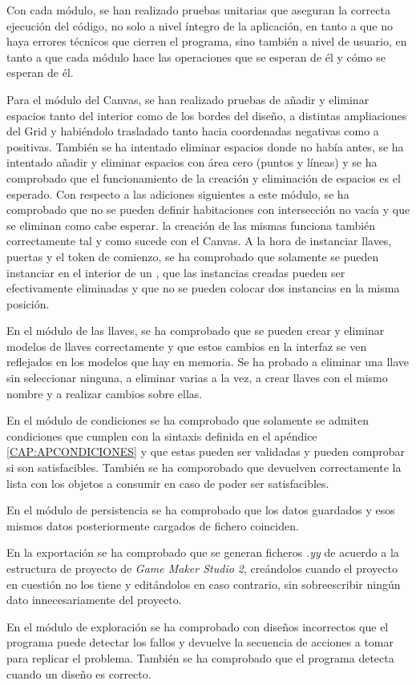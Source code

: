Con cada módulo, se han realizado pruebas unitarias que aseguran la correcta ejecución del código, no solo a nivel íntegro de la aplicación, en tanto a que no haya errores técnicos que cierren el programa, sino también a nivel de usuario, en tanto a que cada módulo hace las operaciones que se esperan de él y cómo se esperan de él.

Para el módulo del Canvas, se han realizado pruebas de añadir y eliminar espacios tanto del interior como de los bordes del diseño, a distintas ampliaciones del Grid y habiéndolo trasladado tanto hacia coordenadas negativas como a positivas. También se ha intentado eliminar espacios donde no había antes, se ha intentado añadir y eliminar espacios con área cero (puntos y líneas) y se ha comprobado que el funcionamiento de la creación y eliminación de espacios es el esperado.
Con respecto a las adiciones siguientes a este módulo, se ha comprobado que no se pueden definir habitaciones con intersección no vacía y que se eliminan como cabe esperar. la creación de las mismas funciona también correctamente tal y como sucede con el Canvas.
A la hora de instanciar llaves, puertas y el token de comienzo, se ha comprobado que solamente se pueden instanciar en el interior de un , que las instancias creadas pueden ser efectivamente eliminadas y que no se pueden colocar dos instancias en la misma posición.

En el módulo de las llaves, se ha comprobado que se pueden crear y eliminar modelos de llaves correctamente y que estos cambios en la interfaz se ven reflejados en los modelos que hay en memoria. Se ha probado a eliminar una llave sin seleccionar ninguna, a eliminar varias a la vez, a crear llaves con el mismo nombre y a realizar cambios sobre ellas.

En el módulo de condiciones se ha comprobado que solamente se admiten condiciones que cumplen con la sintaxis definida en el apéndice \ref{CAP:APCONDICIONES} y que estas pueden ser validadas y pueden comprobar si son satisfacibles. También se ha comporobado que devuelven correctamente la lista con los objetos a consumir en caso de poder ser satisfacibles.

En el módulo de persistencia se ha comprobado que los datos guardados y esos mismos datos posteriormente cargados de fichero coinciden.

En la exportación se ha comprobado que se generan ficheros \textit{.yy} de acuerdo a la estructura de proyecto de \textit{Game Maker Studio 2}, creándolos cuando el proyecto en cuestión no los tiene y editándolos en caso contrario, sin sobreescribir ningún dato innecesariamente del proyecto.

En el módulo de exploración se ha comprobado con diseños incorrectos que el programa puede detectar los fallos y devuelve la secuencia de acciones a tomar para replicar el problema. También se ha comprobado que el programa detecta cuando un diseño es correcto.